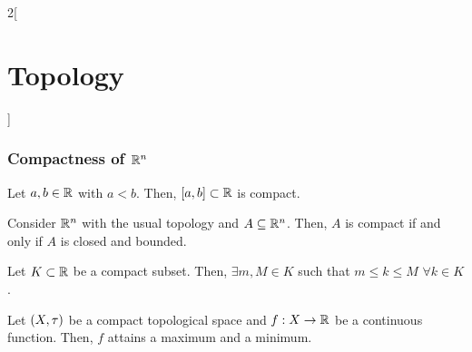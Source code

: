 \documentclass[../../../main.tex]{subfiles}
\begin{document}
\begin{multicols}{2}[\section{Topology}]
  \subsubsection{Compactness of \texorpdfstring{$\mathbb{R}^n$}{Rn}}
  \begin{theorem}
    Let $a,b\in\mathbb{R}$ with $a<b$. Then, $[a,b]\subset\mathbb{R}$ is compact.
  \end{theorem}
  \begin{theorem}
    Consider $\mathbb{R}^n$ with the usual topology and $A\subseteq \mathbb{R}^n$. Then, $A$ is compact if and only if $A$ is closed and bounded.
  \end{theorem}
  \begin{lemma}
    Let $K\subset\mathbb{R}$ be a compact subset. Then, $\exists m,M\in K$ such that $m\leq k\leq M$ $\forall k\in K$.
  \end{lemma}
  \begin{theorem}
    Let $(X,\tau)$ be a compact topological space and $f:X\rightarrow\mathbb{R}$ be a continuous function. Then, $f$ attains a maximum and a minimum.
  \end{theorem}

\end{multicols}
\end{document}
